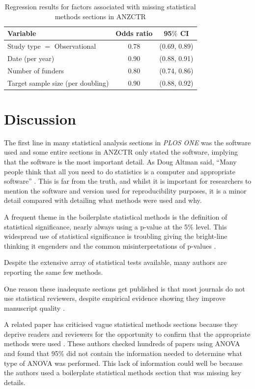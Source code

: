 \documentclass[12pt]{article}
\begin{document}
\begin{table}[]
\centering
\caption{Regression results for factors associated with missing statistical methods sections in ANZCTR}
\label{tab:anzctr-missing-odds}
\begin{tabular}{lcc}
\hline
Variable & Odds ratio & 95$\%$ CI \\
\hline
Study type $=$ Observational & 0.78 & (0.69, 0.89) \\
Date (per year) & 0.90 & (0.88, 0.91) \\
Number of funders & 0.80 & (0.74, 0.86) \\
Target sample size (per doubling) & 0.90 & (0.88, 0.92)\\
\hline
\end{tabular}
\end{table}

\hypertarget{discussion}{%
\section{Discussion}\label{discussion}}

The first line in many statistical analysis sections in \emph{PLOS ONE}
was the software used and some entire sections in ANZCTR only stated the
software, implying that the software is the most important detail. As
Doug Altman said, ``Many people think that all you need to do statistics
is a computer and appropriate software'' \citep{Altman1994}. This is far
from the truth, and whilst it is important for researchers to mention
the software and version used for reproducibility purposes, it is a
minor detail compared with detailing what methods were used and why.

A frequent theme in the boilerplate statistical methods is the
definition of statistical significance, nearly always using a p-value at
the 5\% level. This widespread use of statistical significance is
troubling giving the bright-line thinking it engenders
\citep{McShane2019} and the common misinterpretations of p-values
\citep{Goodman2008}.

Despite the extensive array of statistical tests available, many authors
are reporting the same few methods.

One reason these inadequate sections get published is that most journals
do not use statistical reviewers, despite empirical evidence showing
they improve manuscript quality \citep{Hardwicke2020}.

A related paper has criticised vague statistical methods sections
because they deprive readers and reviewers for the opportunity to
confirm that the appropriate methods were used \citep{Weissgerber2018}.
These authors checked hundreds of papers using ANOVA and found that 95\%
did not contain the information needed to determine what type of ANOVA
was performed. This lack of information could well be because the
authors used a boilerplate statistical methods section that was missing
key details.
\end{document}
